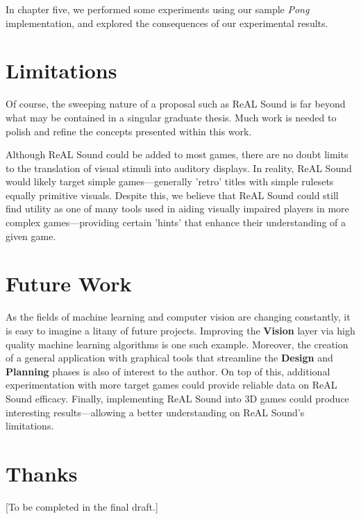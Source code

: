 \documentclass{report}
\newcommand{\rs}{ReAL Sound\xspace}
\newcommand{\plan}{\textbf{Planning}\xspace}
\newcommand{\design}{\textbf{Design}\xspace}
\newcommand{\vision}{\textbf{Vision}\xspace}
\begin{document}
In chapter five, we performed some experiments using our sample \emph{Pong} implementation, and explored the consequences of our experimental results.

\section{Limitations}
Of course, the sweeping nature of a proposal such as \rs is far beyond what may be contained in a singular graduate thesis. Much work is needed to polish and refine the concepts presented within this work.

Although \rs could be added to most games, there are no doubt limits to the translation of visual stimuli into auditory displays. In reality, \rs would likely target simple games---generally 'retro' titles with simple rulesets equally primitive visuals. Despite this, we believe that \rs could still find utility as one of many tools used in aiding visually impaired players in more complex games---providing certain 'hints' that enhance their understanding of a given game. 

\section{Future Work}
As the fields of machine learning and computer vision are changing constantly, it is easy to imagine a litany of future projects. Improving the \vision layer via high quality machine learning algorithms is one such example. Moreover, the creation of a general application with graphical tools that streamline the \design and \plan phases is also of interest to the author. On top of this, additional experimentation with more target games could provide reliable data on \rs efficacy. Finally, implementing \rs into 3D games could produce interesting results---allowing a better understanding on \rs's limitations.

\section{Thanks}
[To be completed in the final draft.]

% 
\printbibliography
\end{document}
